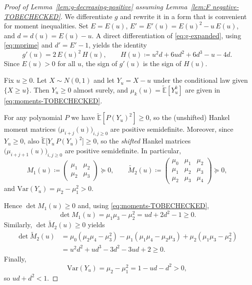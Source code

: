 \documentclass[11pt]{article}
\begin{document}
\begin{proof}[Proof of Lemma~\ref{lem:g-decreasing-positive} assuming Lemma~\ref{lem:F negative-TOBECHECKED}]
We differentiate $g$ and rewrite it in a form that is convenient for moment inequalities. Set $E=E(u)$, $E'=E'(u)=E(u)^2-u\,E(u)$,
and $d=d(u)=E(u)-u$. A direct differentiation of \eqref{eq:g-expanded}, using \eqref{eq:mprime} and
$d'=E'-1$, yields the identity
\begin{equation}\label{eq:gprime}
g'(u)=2\,E(u)^2\,H(u),
\qquad
H(u)\coloneqq u^2 d + 6u d^2 + 6 d^3 - u - 4d .
\end{equation}
Since $E(u)>0$ for all $u$, the sign of $g'(u)$ is the sign of $H(u)$.

Fix $u\ge 0$. Let $X\sim N(0,1)$ and let $Y_u=X-u$ under the conditional law given $\{X\ge u\}$.
Then $Y_u\ge 0$ almost surely, and $\mu_k(u)=\tilde{\mathbb{E}}[Y_u^k]$ are given in \eqref{eq:moments-TOBECHECKED}.

For any polynomial $P$ we have $\tilde{\mathbb{E}}[P(Y_u)^2]\ge 0$, so the (unshifted) Hankel moment matrices
$\bigl(\mu_{i+j}(u)\bigr)_{i,j\ge 0}$ are positive semidefinite. Moreover, since $Y_u\ge 0$,
also $\tilde{\mathbb{E}}\!\bigl[Y_u\,P(Y_u)^2\bigr]\ge 0$, so the \emph{shifted} Hankel matrices
$\bigl(\mu_{i+j+1}(u)\bigr)_{i,j\ge 0}$ are positive semidefinite. In particular,
\[
M_1(u)\coloneqq
\begin{pmatrix}
\mu_1 & \mu_2\\
\mu_2 & \mu_3
\end{pmatrix}
\succeq 0,
\qquad
\widetilde M_2(u)\coloneqq
\begin{pmatrix}
\mu_0 & \mu_1 & \mu_2\\
\mu_1 & \mu_2 & \mu_3\\
\mu_2 & \mu_3 & \mu_4
\end{pmatrix}
\succeq 0,
\]
and $\mathrm{Var}(Y_u)=\mu_2-\mu_1^2>0$.

Hence $\det M_1(u)\ge 0$ and, using \eqref{eq:moments-TOBECHECKED},
\begin{equation}\label{eq:detM1-TOBECHECKED}
\det M_1(u)=\mu_1 \mu_3-\mu_2^2 = u d +2 d^2 -1 \ge 0.
\end{equation}
Similarly, $\det \widetilde M_2(u)\ge 0$ yields
\begin{equation}\label{eq:detM2-TOBECHECKED}
\begin{split}
    \det \widetilde M_2(u) &=\mu_0(\mu_2\mu_4-\mu_3^2)-\mu_1(\mu_1\mu_4-\mu_2\mu_3)+\mu_2(\mu_1\mu_3-\mu_2^2)\\
    &= u^2 d^2 + u d^3 -3 d^2 -3 u d +2 \ge 0.
    \end{split}
\end{equation}
Finally,
\begin{equation}\label{eq:varY-TOBECHECKED}
\mathrm{Var}(Y_u)=\mu_2-\mu_1^2=1-u d-d^2>0,
\end{equation}
so $u d + d^2 < 1$.


\end{proof}
\end{document}
